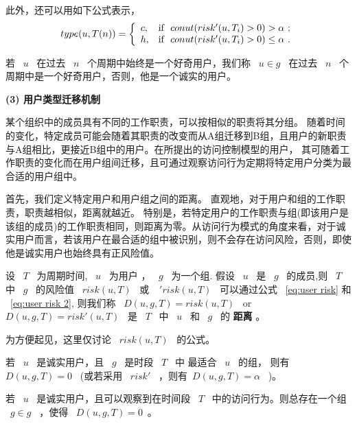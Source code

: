 此外，还可以用如下公式表示，
\begin{equation}\label{eq:user type Tn 2}
type(u,T(n))=
\left\{
\begin{array}{ll}
c, & \hbox{if ~$conut(risk'(u,T_i) > 0) > \alpha$~;} \\
h, & \hbox{if ~$conut(risk'(u,T_i) > 0) \leq \alpha$~.} \\
\end{array}
\right.
\end{equation}

若 ~$u$~ 在过去 ~$n$~ 个周期中始终是一个好奇用户，我们称 ~$u \in g$~ 在过去 ~$n$~ 个周期中是一个好奇用户，否则，他是一个诚实的用户。

\textbf{(3) 用户类型迁移机制}

某个组织中的成员具有不同的工作职责，可以按相似的职责将其分组。 随着时间的变化，特定成员可能会随着其职责的改变而从A组迁移到B组，且用户的新职责与A组相比，更接近B组中的用户。在所提出的访问控制模型的用户， 其可随着工作职责的变化而在用户组间迁移，且可通过观察访问行为定期将特定用户分类为最合适的用户组中。

首先，我们定义特定用户和用户组之间的距离。 直观地，对于用户和组的工作职责，职责越相似，距离就越近。 特别是，若特定用户的工作职责与组(即该用户是该组的成员)的工作职责相同，则距离为零。从访问行为模式的角度来看，对于诚实用户而言，若该用户在最合适的组中被识别，则不会存在访问风险，否则，即使他是诚实用户也始终具有正风险值。

\begin{definition}%
	\label{user-group distance}
	设 ~$T$~ 为周期时间, ~$u$~ 为用户 ， ~$g$~ 为一个组. 假设 ~$u$~ 是 ~$g$~ 的成员,则 ~$T$~ 中 ~$g$~ 的风险值 ~$risk(u,T)$~ 或 ~$~'risk(u,T)$~ 可以通过公式 ~\ref{eq:user risk} 和 ~\ref{eq:user risk 2}, 则我们称 ~$D(u,g,T)=risk(u,T)$~ or ~$D(u,g,T)=risk'(u,T)$~ 是 ~$T$~ 中 ~$u$~ 和 ~$g$~ 的 \textbf{距离} 。
\end{definition}

为方便起见，这里仅讨论 ~$risk(u,T)$~ 的公式。

\begin{claim}[用户组距离]
	若 ~$u$~ 是诚实用户，且 ~$g$~ 是时段 ~$T$~ 中 最适合 ~$u$~ 的组， 则有 ~$D(u,g,T)=0$~ (或若采用 ~$risk'$~ ，则有~$D(u,g,T)=\alpha$~ )。
\end{claim}

\begin{claim}
	若 ~$u$~ 是诚实用户，且可以观察到在时间段 ~$T$~ 中的访问行为。则总存在一个组 ~$g \in g$~ ，使得 ~$D(u,g,T)=0$~。
\end{claim}

